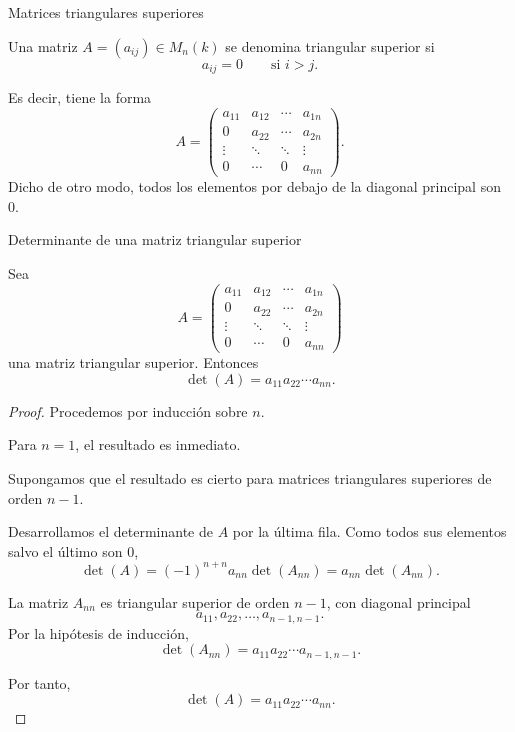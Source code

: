 \begin{frame}{Matrices triangulares superiores}

\begin{definition}
Una matriz \(A=(a_{ij})\in M_n(k)\) se denomina
\alert{triangular superior} si
\[
a_{ij}=0
\qquad\text{si }i>j.
\]

Es decir, tiene la forma
\[
A=
\begin{pmatrix}
a_{11} & a_{12} & \cdots & a_{1n}\\
0      & a_{22} & \cdots & a_{2n}\\
\vdots & \ddots & \ddots & \vdots\\
0      & \cdots & 0      & a_{nn}
\end{pmatrix}.
\]
Dicho de otro modo, todos los elementos por debajo de la diagonal principal son \(0\).
\end{definition}

\end{frame}
\begin{frame}[allowframebreaks]{Determinante de una matriz triangular superior}

\begin{proposition}
Sea
\[
A=
\begin{pmatrix}
a_{11} & a_{12} & \cdots & a_{1n}\\
0      & a_{22} & \cdots & a_{2n}\\
\vdots & \ddots & \ddots & \vdots\\
0      & \cdots & 0      & a_{nn}
\end{pmatrix}
\]
una matriz triangular superior. Entonces
\[
\det(A)=a_{11}a_{22}\cdots a_{nn}.
\]
\end{proposition}

\begin{proof}
Procedemos por inducción sobre \(n\).

Para \(n=1\), el resultado es inmediato.

Supongamos que el resultado es cierto para matrices triangulares
superiores de orden \(n-1\).

Desarrollamos el determinante de \(A\) por la última fila. Como todos
sus elementos salvo el último son \(0\),
\[
\det(A)
=
(-1)^{n+n}a_{nn}\det(A_{nn})
=
a_{nn}\det(A_{nn}).
\]

La matriz \(A_{nn}\) es triangular superior de orden \(n-1\), con
diagonal principal
\[
a_{11},a_{22},\ldots,a_{n-1,n-1}.
\]
Por la hipótesis de inducción,
\[
\det(A_{nn})
=
a_{11}a_{22}\cdots a_{n-1,n-1}.
\]

Por tanto,
\[
\det(A)
=
a_{11}a_{22}\cdots a_{nn}.
\]
\end{proof}

\end{frame}

